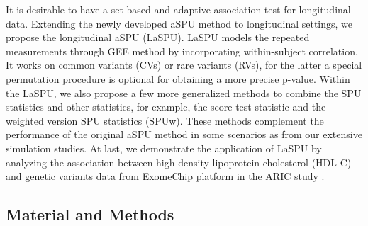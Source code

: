 \documentclass[12pt]{article}
\begin{document}
It is desirable to have a set-based and adaptive association test for longitudinal data. Extending the newly developed aSPU method to longitudinal settings, we propose the longitudinal aSPU (LaSPU). LaSPU models the repeated measurements through GEE method by incorporating within-subject correlation. It works on common variants (CVs) or rare variants (RVs), for the latter a special permutation procedure is optional for obtaining a more precise p-value. Within the LaSPU, we also propose a few more generalized methods to combine the SPU statistics and other statistics, for example, the score test statistic and the weighted version SPU statistics (SPUw). These methods complement the performance of the original aSPU method in some scenarios as from our extensive simulation studies. At last, we demonstrate the application of LaSPU by analyzing the association between high density lipoprotein cholesterol (HDL-C) and genetic variants data from ExomeChip platform \cite{Grove2013} in the ARIC study \cite{Heiss1989}.
\subsection{Material and Methods}
\end{document}
